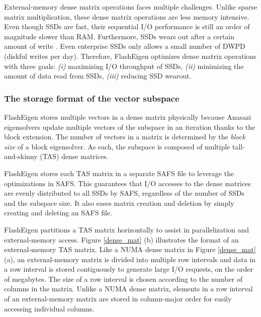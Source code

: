 External-memory dense matrix operations faces multiple challenges.
Unlike sparse matrix multiplication, these dense matrix operations are less
memory intensive. Even though SSDs are fast, their sequential I/O performance
is still an order of magnitude slower than RAM.
Furthermore, SSDs wears out after a certain amount of write \cite{}.
Even enterprise SSDs \cite{} only allows a small number of DWPD
(diskful writes per day). Therefore, FlashEigen optimizes dense matrix operations
with three goals: \textit{(i)} maximizing I/O throughput of SSDs, \textit{(ii)}
minimizing the amount of data read from SSDs, \textit{(iii)} reducing SSD
wearout.

%		

\subsubsection{The storage format of the vector subspace}
FlashEigen stores multiple vectors in a dense matrix physically because Anasazi
eigensolvers update multiple vectors of the subspace in an iteration thanks to
the block extension. The number of vectors in a matrix is determined by
the \textit{block size} of a block eigensolver. %
As such, the subspace is composed of multiple tall-and-skinny (TAS) dense
matrices.

FlashEigen stores each TAS matrix in a separate SAFS file to leverage
the optimizations in SAFS. This guarantees that I/O accesses to the dense
matrices are evenly distributed to all SSDs by SAFS, regardless of the number
of SSDs and the subspace size. It also eases matrix creation and deletion by
simply creating and deleting an SAFS file.

FlashEigen partitions a TAS matrix horizontally to assist in parallelization
and external-memory access. Figure \ref{dense_mat} (b) illustrates the format
of an external-memory TAS matrix. Like
a NUMA dense matrix in Figure \ref{dense_mat} (a), an external-memory matrix
is divided into multiple row intervals and data in a row interval is stored
contiguously to generate large I/O requests, on the order of megabytes.
The size of a row interval is chosen according to the number of columns in the matrix.
Unlike a NUMA dense matrix, elements in a row interval of an external-memory
matrix are stored in column-major order for easily accessing individual columns.

